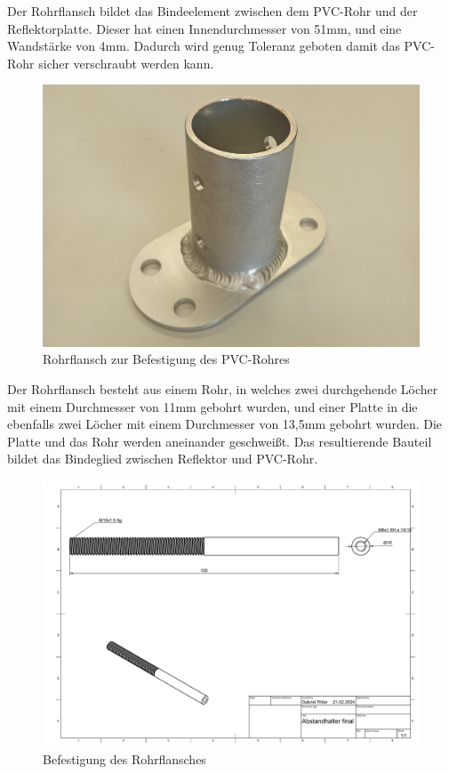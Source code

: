 Der Rohrflansch bildet das Bindeelement zwischen dem PVC-Rohr und der Reflektorplatte. Dieser hat einen Innendurchmesser von 51mm, und eine Wandstärke von 4mm. Dadurch wird genug Toleranz geboten damit das PVC-Rohr sicher verschraubt werden kann. 

\begin{figure}[h!]
	\centering
	\includegraphics[width=\textwidth]{../ref/Antenne-Rohrflansch.jpg}
	\caption{Rohrflansch zur Befestigung des PVC-Rohres}
	\label{fig:Rohrflansch-Antenne}
\end{figure}

Der Rohrflansch besteht aus einem Rohr, in welches zwei durchgehende Löcher mit einem Durchmesser von 11mm gebohrt wurden, und einer Platte in die ebenfalls zwei Löcher mit einem Durchmesser von 13,5mm gebohrt wurden. Die Platte und das Rohr werden aneinander geschweißt. Das resultierende Bauteil bildet das Bindeglied zwischen Reflektor und PVC-Rohr.

\begin{figure}[h!]
	\centering
	\includegraphics[width=\textwidth]{../ref/Abstandhalter final Zeichnung v2.pdf}
	\caption{Befestigung des Rohrflansches}
	\label{fig:Rohrflansch-Antenne-Verbindung}
\end{figure}

